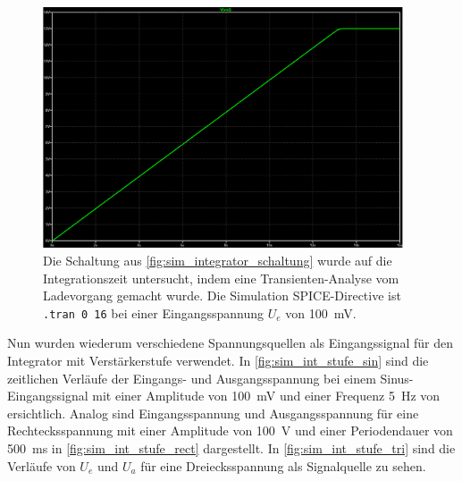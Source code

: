 \documentclass[12pt,english,ngerman]{scrartcl}
\begin{document}
\begin{figure}[H]
  \centering
    \includegraphics[width=0.95\textwidth]{./figures/integrator/sim/mit_stufe/100mv_aus_zeit.png}
  \caption{Die Schaltung aus \autoref{fig:sim_integrator_schaltung} wurde auf
  die Integrationszeit untersucht, indem eine Transienten-Analyse vom
  Ladevorgang gemacht wurde. Die Simulation SPICE-Directive ist \texttt{.tran 0 16} 
  bei einer Eingangsspannung $U_e$ von \SI{100}{\milli\volt}.}
  \label{fig:sim_integrator_stufe_integrationszeit}
\end{figure}

Nun wurden wiederum verschiedene Spannungsquellen als Eingangssignal für den
Integrator mit Verstärkerstufe verwendet. In \autoref{fig:sim_int_stufe_sin}
sind die zeitlichen Verläufe der Eingangs- und Ausgangsspannung bei einem
Sinus-Eingangssignal mit einer Amplitude von \SI{100}{\milli\volt} und einer
Frequenz \SI{5}{\hertz} von ersichtlich. Analog sind Eingangsspannung und
Ausgangsspannung für eine Rechtecksspannung mit einer Amplitude von
\SI{100}{\volt} und einer Periodendauer von \SI{500}{\milli\second} in
\autoref{fig:sim_int_stufe_rect} dargestellt. In
\autoref{fig:sim_int_stufe_tri} sind die Verläufe von $U_e$ und $U_a$ für eine
Dreiecksspannung als Signalquelle zu sehen.

\end{document}

